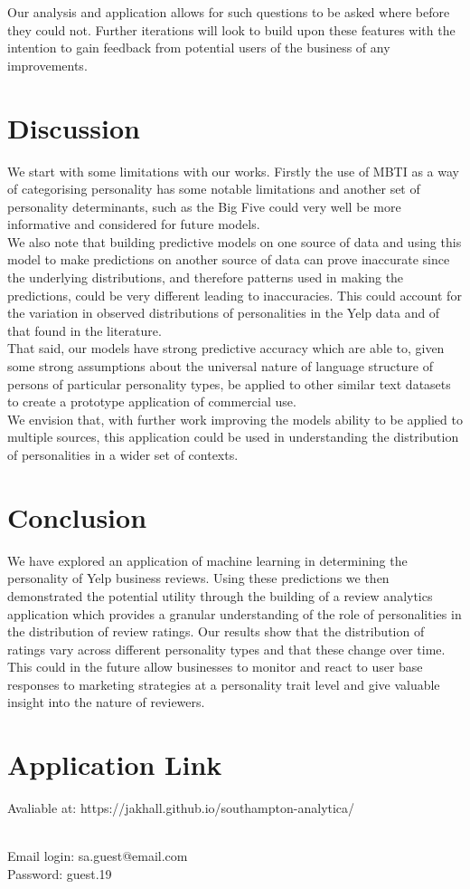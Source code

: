\documentclass[sigconf, nonacm]{acmart}
\begin{document}
Our analysis and application allows for such questions to be asked where before they could not. Further iterations will look to build upon these features with the intention to gain feedback from potential users of the business of any improvements. 

\section{Discussion}

We start with some limitations with our works. Firstly the use of MBTI as a way of categorising personality has some notable limitations \cite{boyle1995myers} and another set of personality determinants, such as the Big Five \cite{gosling2003very} could very well be more informative and considered for future models. \\

We also note that building predictive models on one source of data and using this model to make predictions on another source of data can prove inaccurate since the underlying distributions, and therefore patterns used in making the predictions, could be very different leading to inaccuracies. This could account for the variation in observed distributions of personalities in the Yelp data and of that found in the literature. \\

That said, our models have strong predictive accuracy which are able to, given some strong assumptions about the universal nature of language structure of persons of particular personality types, be applied to other similar text datasets to create a prototype application of commercial use. \\

We envision that, with further work improving the models ability to be applied to multiple sources, this application could be used in understanding the distribution of personalities in a wider set of contexts. \\


\section{Conclusion}

We have explored an application of machine learning in determining the personality of Yelp business reviews. Using these predictions we then demonstrated the potential utility through the building of a review analytics application which provides a granular understanding of the role of personalities in the distribution of review ratings. Our results show that the distribution of ratings vary across different personality types and that these change over time. This could in the future allow businesses to monitor and react to user base responses to marketing strategies at a personality trait level and give valuable insight into the nature of reviewers.

\section{Application Link}

Avaliable at: https://jakhall.github.io/southampton-analytica/

\\
Email login: sa.guest@email.com \\
Password: guest.19 



\end{document}
